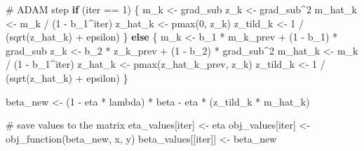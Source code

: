 \documentclass[
  letterpaper,
  DIV=11,
  numbers=noendperiod]{scrartcl}
\newenvironment{Shaded}{\begin{snugshade}}{\end{snugshade}}
\newcommand{\CommentTok}[1]{\textcolor[rgb]{0.37,0.37,0.37}{#1}}
\newcommand{\ControlFlowTok}[1]{\textcolor[rgb]{0.00,0.23,0.31}{\textbf{#1}}}
\newcommand{\DecValTok}[1]{\textcolor[rgb]{0.68,0.00,0.00}{#1}}
\newcommand{\FunctionTok}[1]{\textcolor[rgb]{0.28,0.35,0.67}{#1}}
\newcommand{\NormalTok}[1]{\textcolor[rgb]{0.00,0.23,0.31}{#1}}
\newcommand{\OtherTok}[1]{\textcolor[rgb]{0.00,0.23,0.31}{#1}}
\newcommand{\SpecialCharTok}[1]{\textcolor[rgb]{0.37,0.37,0.37}{#1}}
\begin{document}
\begin{Shaded}
\begin{Highlighting}[]
    \CommentTok{\# ADAM step}
    \ControlFlowTok{if}\NormalTok{ (iter }\SpecialCharTok{==} \DecValTok{1}\NormalTok{) \{}
\NormalTok{      m\_k }\OtherTok{\textless{}{-}}\NormalTok{ grad\_sub}
\NormalTok{      z\_k }\OtherTok{\textless{}{-}}\NormalTok{ grad\_sub}\SpecialCharTok{\^{}}\DecValTok{2}
\NormalTok{      m\_hat\_k }\OtherTok{\textless{}{-}}\NormalTok{ m\_k }\SpecialCharTok{/}\NormalTok{ (}\DecValTok{1} \SpecialCharTok{{-}}\NormalTok{ b\_1}\SpecialCharTok{\^{}}\NormalTok{iter)}
\NormalTok{      z\_hat\_k }\OtherTok{\textless{}{-}} \FunctionTok{pmax}\NormalTok{(}\DecValTok{0}\NormalTok{, z\_k)}
\NormalTok{      z\_tild\_k }\OtherTok{\textless{}{-}} \DecValTok{1} \SpecialCharTok{/}\NormalTok{ (}\FunctionTok{sqrt}\NormalTok{(z\_hat\_k) }\SpecialCharTok{+}\NormalTok{ epsilon)}
\NormalTok{    \} }\ControlFlowTok{else}\NormalTok{ \{}
\NormalTok{      m\_k }\OtherTok{\textless{}{-}}\NormalTok{ b\_1 }\SpecialCharTok{*}\NormalTok{ m\_k\_prev }\SpecialCharTok{+}\NormalTok{ (}\DecValTok{1} \SpecialCharTok{{-}}\NormalTok{ b\_1) }\SpecialCharTok{*}\NormalTok{ grad\_sub}
\NormalTok{      z\_k }\OtherTok{\textless{}{-}}\NormalTok{ b\_2 }\SpecialCharTok{*}\NormalTok{ z\_k\_prev }\SpecialCharTok{+}\NormalTok{ (}\DecValTok{1} \SpecialCharTok{{-}}\NormalTok{ b\_2) }\SpecialCharTok{*}\NormalTok{ grad\_sub}\SpecialCharTok{\^{}}\DecValTok{2}
\NormalTok{      m\_hat\_k }\OtherTok{\textless{}{-}}\NormalTok{ m\_k }\SpecialCharTok{/}\NormalTok{ (}\DecValTok{1} \SpecialCharTok{{-}}\NormalTok{ b\_1}\SpecialCharTok{\^{}}\NormalTok{iter)}
\NormalTok{      z\_hat\_k }\OtherTok{\textless{}{-}} \FunctionTok{pmax}\NormalTok{(z\_hat\_k\_prev, z\_k)}
\NormalTok{      z\_tild\_k }\OtherTok{\textless{}{-}} \DecValTok{1} \SpecialCharTok{/}\NormalTok{ (}\FunctionTok{sqrt}\NormalTok{(z\_hat\_k) }\SpecialCharTok{+}\NormalTok{ epsilon)}
\NormalTok{    \}}
    
\NormalTok{    beta\_new }\OtherTok{\textless{}{-}}\NormalTok{ (}\DecValTok{1} \SpecialCharTok{{-}}\NormalTok{ eta }\SpecialCharTok{*}\NormalTok{ lambda) }\SpecialCharTok{*}\NormalTok{ beta }\SpecialCharTok{{-}}\NormalTok{ eta }\SpecialCharTok{*}\NormalTok{ (z\_tild\_k }\SpecialCharTok{*}\NormalTok{ m\_hat\_k)}
    
    \CommentTok{\# save values to the matrix}
\NormalTok{    eta\_values[iter] }\OtherTok{\textless{}{-}}\NormalTok{ eta}
\NormalTok{    obj\_values[iter] }\OtherTok{\textless{}{-}} \FunctionTok{obj\_function}\NormalTok{(beta\_new, x, y)}
\NormalTok{    beta\_values[[iter]] }\OtherTok{\textless{}{-}}\NormalTok{ beta\_new}
    

\end{Highlighting}
\end{Shaded}
\end{document}
